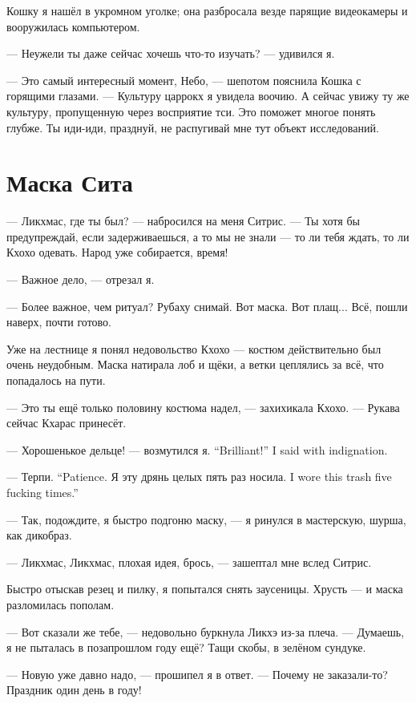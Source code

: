 \textspace

Кошку я нашёл в укромном уголке; она разбросала везде парящие видеокамеры и вооружилась компьютером.

--- Неужели ты даже сейчас хочешь что-то изучать? --- удивился я.

--- Это самый интересный момент, Небо, --- шепотом пояснила Кошка с горящими глазами.
--- Культуру царрокх я увидела воочию.
А сейчас увижу ту же культуру, пропущенную через восприятие тси.
Это поможет многое понять глубже.
Ты иди-иди, празднуй, не распугивай мне тут объект исследований.

\textspace

\section{Маска Сита}

--- Ликхмас, где ты был? --- набросился на меня Ситрис.
--- Ты хотя бы предупреждай, если задерживаешься, а то мы не знали --- то ли тебя ждать, то ли Кхохо одевать.
Народ уже собирается, время!

--- Важное дело, --- отрезал я.

--- Более важное, чем ритуал?
Рубаху снимай.
Вот маска. Вот плащ...
Всё, пошли наверх, почти готово.

Уже на лестнице я понял недовольство Кхохо --- костюм действительно был очень неудобным.
Маска натирала лоб и щёки, а ветки цеплялись за всё, что попадалось на пути.

--- Это ты ещё только половину костюма надел, --- захихикала Кхохо.
--- Рукава сейчас Кхарас принесёт.

{--- Хорошенькое дельце! --- возмутился я.}
{``Brilliant!'' I said with indignation.}

{--- Терпи.}
{``Patience.}
{Я эту дрянь целых пять раз носила.}
{I wore this trash five fucking times.''}

--- Так, подождите, я быстро подгоню маску, --- я ринулся в мастерскую, шурша, как дикобраз.

--- Ликхмас, Ликхмас, плохая идея, брось, --- зашептал мне вслед Ситрис.

Быстро отыскав резец и пилку, я попытался снять заусеницы.
Хрусть --- и маска разломилась пополам.

--- Вот сказали же тебе, --- недовольно буркнула Ликхэ из-за плеча.
--- Думаешь, я не пыталась в позапрошлом году ещё?
Тащи скобы, в зелёном сундуке.

--- Новую уже давно надо, --- прошипел я в ответ.
--- Почему не заказали-то?
Праздник один день в году!

